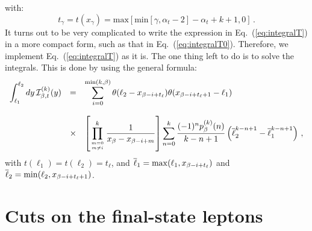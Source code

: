 \documentclass[10pt,a4paper]{article}
\begin{document}
with:
\begin{equation}
t_\gamma = t(x_\gamma) = \mbox{max}\left[\mbox{min}\left[\gamma,\alpha_t -2\right] -\alpha_t+k + 1, 0\right] \,.
\end{equation}
It turns out to be very complicated to write the expression in
Eq.~(\ref{eq:integralT}) in a more compact form, such as that in
Eq.~(\ref{eq:integralT0}). Therefore, we implement
Eq.~(\ref{eq:integralT}) as it is. The one thing left to do is to
solve the integrals. This is done by using the general formula:
\begin{equation}
\begin{array}{rcl}
  \displaystyle\int_{\ell_1}^{\ell_2}dy\,\mathcal{I}_{\beta,t}^{(k)}(y)
  &=&\displaystyle \sum_{i=0}^{{\rm min}(k,\beta)}
                                                                      \theta(\ell_2-x_{\beta-i+t_\ell})\theta(x_{\beta-i+t_\ell+1}-\ell_1)\\
  \\
                                                                  &\times&\displaystyle \left[\prod^{k}_{m=0\atop m\ne
                                                                           i}\frac{1}{x_{\beta}-x_{\beta-i+m}}\right]
                                                                           \sum_{n=0}^k \frac{(-1)^n p_{\beta}^{(k)}(n)}{k-n+1} \left(\overline{\ell}_2^{k-n+1}-\overline{\ell}_1^{k-n+1}\right)\,,
\end{array}
\end{equation}
with $t(\ell_1)=t(\ell_2)=t_\ell$, and
$\overline{\ell}_1={\rm max}(\ell_1,x_{\beta-i+t_\ell})$ and
$\overline{\ell}_2={\rm min}(\ell_2,x_{\beta-i+t_\ell+1})$.

\section{Cuts on the final-state leptons}
\end{document}
